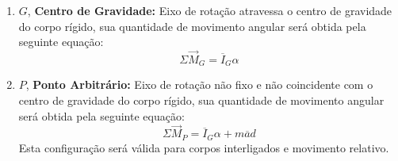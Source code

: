 \documentclass{article}
\begin{document}
                \begin{enumerate}[rightmargin = \leftmargin]
                    \item $G$, \textbf{Centro de Gravidade:} Eixo de rotação atravessa o centro de gravidade do corpo rígido, sua quantidade de movimento angular será obtida pela seguinte equação:
                        \begin{equation}
                            \boxed{
                                \Sigma\vec{M}_{G} = \overline{I}_{G}\alpha
                            }
                        \end{equation}

                    \item $P$, \textbf{Ponto Arbitrário:} Eixo de rotação não fixo e não coincidente com o centro de gravidade do corpo rígido, sua quantidade de movimento angular será obtida pela seguinte equação:
                        \begin{equation}
                            \boxed{
                                \Sigma\vec{M}_{P} = 
                                \overline{I}_{G}\alpha + m\overline{a}d
                            }
                        \end{equation}
                    Esta configuração será válida para corpos interligados e movimento relativo.


\end{enumerate}
\end{document}
